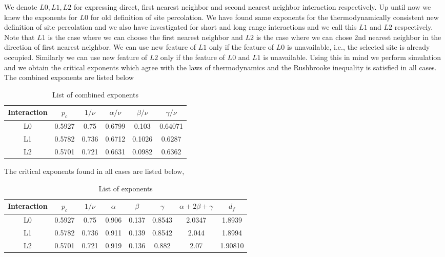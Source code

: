 We denote $L0,L1,L2$ for expressing direct, first nearest neighbor and second nearest neighbor interaction respectively. Up until now we knew the exponents for $L0$ for old definition of site percolation. We have found same exponents for the thermodynamically consistent new definition of site percolation and we also have investigated for short and long range interactions and we call this $L1$ and $L2$ respectively. Note that $L1$ is the case where we can choose the first nearest neighbor and $L2$ is the case where we can chose 2nd nearest neighbor in the direction of first nearest neighbor. We can use new feature of $L1$ only if the feature of $L0$ is unavailable, i.e., the selected site is already occupied. Similarly we can use new feature of $L2$ only if the feature of $L0$ and $L1$ is unavailable. Using this in mind we perform simulation and we obtain the critical exponents which agree with the laws of thermodynamics and the Rushbrooke inequality is satisfied in all cases.\\
The combined exponents are listed below\\
\begin{table}
\centering
\begin{tabular}{|c|c|c|c|c|c|}
	\hline
	Interaction & $p_c$ & $1/\nu$ & $\alpha/\nu$ & $\beta/\nu$ & $\gamma/\nu$ \\ \hline
	L0 & 0.5927 & 0.75  & 0.6799 & 0.103  & 0.64071  \\ \hline
	L1 & 0.5782 & 0.736 & 0.6712 & 0.1026 & 0.6287  \\ \hline
	L2 & 0.5701 & 0.721 & 0.6631 & 0.0982 & 0.6362  \\ \hline
\end{tabular}
\caption{List of combined exponents}
\label{tab:exponents-combined}
\end{table}
The critical exponents found in all cases are listed below,\\
\begin{table}
\centering
\begin{tabular}{|c|c|c|c|c|c|c|c|}
	\hline
	Interaction & $p_c$ & $1/\nu$ & $\alpha$ & $\beta$ & $\gamma$ & $\alpha+2\beta+\gamma$ & $d_f$\\ \hline
	L0 & 0.5927 & 0.75  & 0.906 & 0.137 & 0.8543 & 2.0347 & 1.8939  \\ \hline
	L1 & 0.5782 & 0.736 & 0.911 & 0.139 & 0.8542 & 2.044  & 1.8994  \\ \hline
	L2 & 0.5701 & 0.721 & 0.919 & 0.136 & 0.882  & 2.07   & 1.90810 \\ \hline

\end{tabular}
\caption{List of exponents}
\label{tab:exponents}
\end{table}
